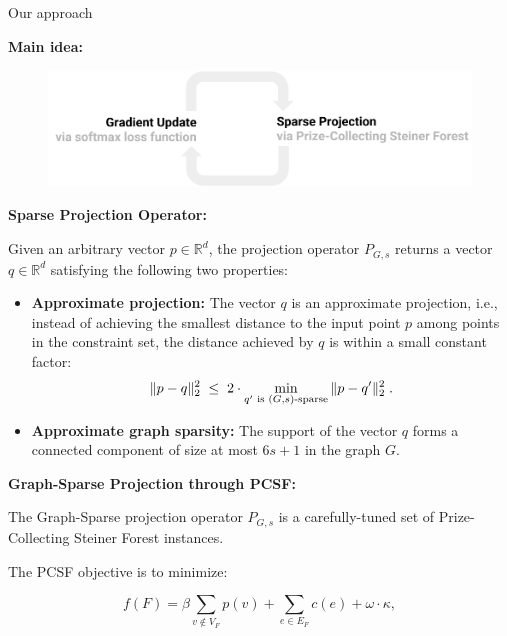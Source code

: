 \documentclass[svgnames,final]{beamer}
\newcommand{\R}{\ensuremath{\mathbb{R}}}
\begin{document}
\begin{frame}
\begin{columns}[T]
\begin{column}{.3\linewidth}
\begin{block}{Our approach}
		\vspace{2cm}

		\textbf{Main idea:}

		\begin{figure}[h]
		\centering
		\includegraphics[width=\linewidth]{images/algo.pdf}
		\label{fig:test}
		\end{figure}


		\vspace{2cm}

		\textbf{Sparse Projection Operator:}

		Given an arbitrary vector $p \in \R^d$, the projection operator $P_{G,s}$
		returns a vector $q \in \R^d$ satisfying the following two properties:
		\begin{itemize}
		\item \textbf{Approximate projection:} The vector $q$ is an approximate projection,
					i.e., instead of achieving the smallest distance to the input point $p$ among points in the constraint set,
					the distance achieved by $q$ is within a small constant factor:
		\begin{equation}
		\label{eq:approxproj}
		  \|p - q \|_2^2  \; \leq \; 2 \cdot \min_{q' \textnormal{ is } (G,s)\textnormal{-sparse}} \| p - q'\|_2^2 \; .
		\end{equation}
		\item \textbf{Approximate graph sparsity:} The support of the vector $q$ forms
					a connected component of size at most $6s + 1$ in the graph $G$.
		\end{itemize}


		\vspace{2cm}

		\textbf{Graph-Sparse Projection through PCSF:}

		The Graph-Sparse projection operator $P_{G,s}$ is a carefully-tuned set of Prize-Collecting Steiner Forest instances.

		The PCSF objective is to minimize:

		\begin{equation}
			f(F) = \beta \sum_{v\notin V_F} p(v) + \sum_{e\in E_F} c(e) + \omega \cdot \kappa,
		\end{equation}


\end{block}
\end{column}
\end{columns}
\end{frame}
\end{document}
